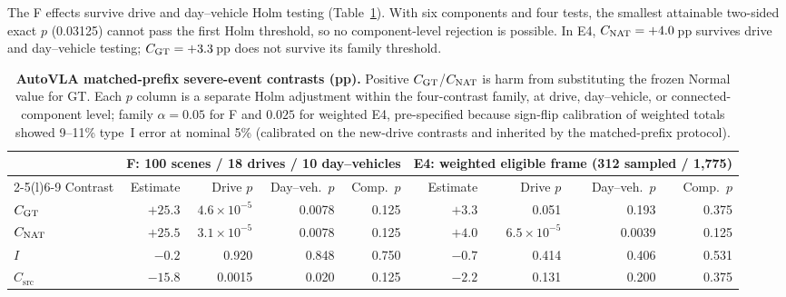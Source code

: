 The F effects survive drive and day--vehicle Holm testing (Table~\ref{tab:matched}). With six components and four tests, the smallest attainable two-sided exact $p$ (0.03125) cannot pass the first Holm threshold, so no component-level rejection is possible. In E4, $C_{\mathrm{NAT}}=+4.0$\,pp survives drive and day--vehicle testing; $C_{\mathrm{GT}}=+3.3$\,pp does not survive its family threshold.

\begin{table}[t]
\centering\small
\caption{\textbf{AutoVLA matched-prefix severe-event contrasts (pp).} Positive $C_{\mathrm{GT}}$/$C_{\mathrm{NAT}}$ is harm from substituting the frozen Normal value for GT. Each $p$ column is a separate Holm adjustment within the four-contrast family, at drive, day--vehicle, or connected-component level; family $\alpha=0.05$ for F and $0.025$ for weighted E4, pre-specified because sign-flip calibration of weighted totals showed 9--11\% type~I error at nominal 5\% (calibrated on the new-drive contrasts and inherited by the matched-prefix protocol).}
\label{tab:matched}
\setlength{\tabcolsep}{4.5pt}
\begin{tabular}{@{}lrrrrrrrr@{}}\toprule
 & \multicolumn{4}{c}{F: 100 scenes / 18 drives / 10 day--vehicles} & \multicolumn{4}{c}{E4: weighted eligible frame (312 sampled / 1,775)}\\\cmidrule(lr){2-5}\cmidrule(l){6-9}
Contrast & Estimate & Drive $p$ & Day--veh.\ $p$ & Comp.\ $p$ & Estimate & Drive $p$ & Day--veh.\ $p$ & Comp.\ $p$\\\midrule
$C_{\mathrm{GT}}$ & $+25.3$ & $4.6\!\times\!10^{-5}$ & 0.0078 & 0.125 & $+3.3$ & 0.051 & 0.193 & 0.375\\
$C_{\mathrm{NAT}}$ & $+25.5$ & $3.1\!\times\!10^{-5}$ & 0.0078 & 0.125 & $+4.0$ & $6.5\!\times\!10^{-5}$ & 0.0039 & 0.125\\
$I$ & $-0.2$ & 0.920 & 0.848 & 0.750 & $-0.7$ & 0.414 & 0.406 & 0.531\\
$C_{\mathrm{src}}$ & $-15.8$ & 0.0015 & 0.020 & 0.125 & $-2.2$ & 0.131 & 0.200 & 0.375\\\bottomrule
\end{tabular}
\end{table}

